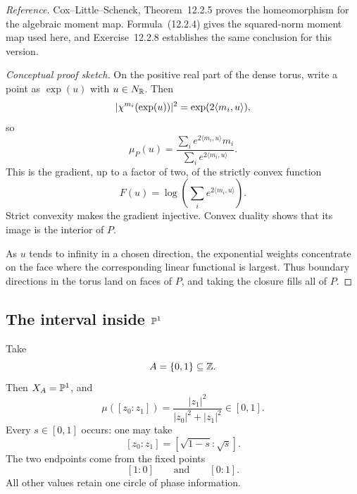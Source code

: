 \noindent
\textit{Reference.}
Cox--Little--Schenck, Theorem~12.2.5 proves the homeomorphism for the
algebraic moment map. Formula~(12.2.4) gives the squared-norm moment map
used here, and Exercise~12.2.8 establishes the same conclusion for this
version.

\begin{proof}[Conceptual proof sketch]
On the positive real part of the dense torus, write a point as
\(\exp(u)\) with \(u\in N_{\mathbb{R}}\). Then
\[
\lvert\chi^{m_i}(\exp(u))\rvert^2
=
\exp(2\langle m_i,u\rangle),
\]
so
\[
\mu_P(u)
=
\frac{\sum_i e^{2\langle m_i,u\rangle}m_i}
     {\sum_i e^{2\langle m_i,u\rangle}}.
\]
This is the gradient, up to a factor of two, of the strictly convex
function
\[
F(u)=\log\left(\sum_i e^{2\langle m_i,u\rangle}\right).
\]
Strict convexity makes the gradient injective. Convex duality shows
that its image is the interior of \(P\).

As \(u\) tends to infinity in a chosen direction, the exponential
weights concentrate on the face where the corresponding linear
functional is largest. Thus boundary directions in the torus land on
faces of \(P\), and taking the closure fills all of \(P\).
\end{proof}

\begin{center}
\end{center}

\subsection{The interval inside \texorpdfstring{\(\mathbb{P}^1\)}{P1}}

\begin{example}
\label{ex:moment-map-projective-line}
Take
\[
A=\{0,1\}\subseteq\mathbb{Z}.
\]
Then \(X_A=\mathbb{P}^1\), and
\[
\mu([z_0:z_1])
=
\frac{\lvert z_1\rvert^2}
     {\lvert z_0\rvert^2+\lvert z_1\rvert^2}
\in[0,1].
\]
Every \(s\in[0,1]\) occurs: one may take
\[
[z_0:z_1]=[\sqrt{1-s}:\sqrt{s}].
\]
The two endpoints come from the fixed points
\[
[1:0]
\qquad\text{and}\qquad
[0:1].
\]
All other values retain one circle of phase information.
\end{example}

